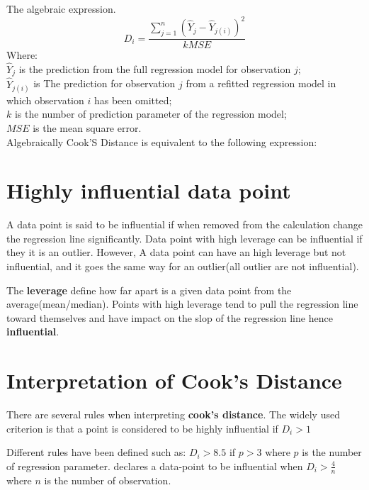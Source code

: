 \documentclass{article}[16pt]
\begin{document}
\bigskip
The algebraic expression.
$$D_i = \frac{\sum_{j=1}^n \left( \hat{Y}_j - \hat{Y}_{j(i)}  \right) ^2}{k MSE}$$
Where:\\
$\hat{Y}_j$ is the prediction from the full regression model for observation $j$; \\
$\hat{Y}_{j(i)}$ is The prediction for observation $j$ from a refitted regression model in which observation $i$ has been omitted;\\
$k$ is the number of prediction parameter of the regression model;\\
$MSE$ is the mean square error.\\

Algebraically Cook'S Distance is equivalent to the following expression:

\section{Highly influential  data point}
A data point is said to be influential if when removed from the calculation change the regression line significantly. Data point with high leverage can be influential if they it is an outlier. However, A data point can have an high leverage but not influential, and it goes the same way for an outlier(all outlier are not influential).

The {\bf leverage} define how far apart is a given data point from the average(mean/median). Points with high leverage tend to pull the regression line toward themselves and have impact on the slop of the regression line hence {\bf influential}.
\section{Interpretation of Cook's Distance}
There are several rules when interpreting {\bf cook's distance}. The widely used criterion is that a point is considered to be highly influential if $D_i > 1$ \citep{weisberg}

Different rules have  been defined such as: $D_i > 8.5$ if $p > 3$ \citep{barry}   where $p$ is the number of regression parameter. \citep{Robert} declares a data-point to be influential when $D_i > \frac{4}{n}$ where $n$ is the number of observation.
\end{document}
